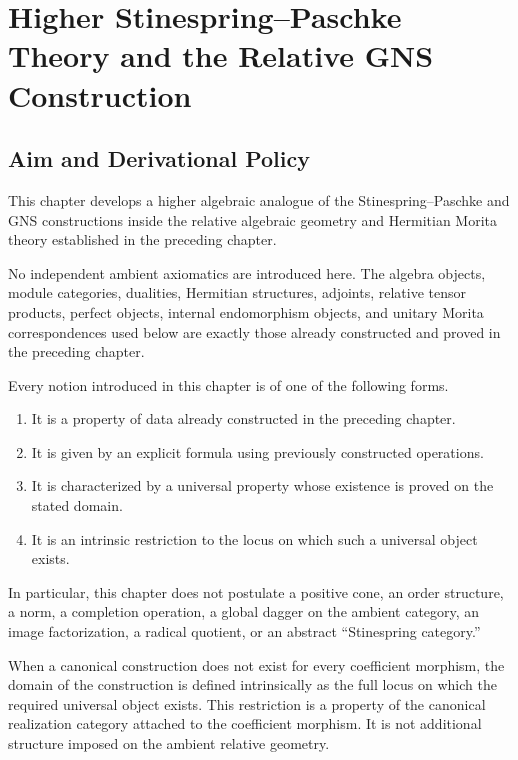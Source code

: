 \chapter{Higher Stinespring--Paschke Theory and the Relative GNS Construction}
\label{chap:higher-stinespring-paschke-gns}

\section{Aim and Derivational Policy}
\label{sec:higher-stinespring-aim-policy}

This chapter develops a higher algebraic analogue of the
Stinespring--Paschke and GNS constructions inside the relative algebraic
geometry and Hermitian Morita theory established in the preceding chapter.

No independent ambient axiomatics are introduced here. The algebra objects,
module categories, dualities, Hermitian structures, adjoints, relative tensor
products, perfect objects, internal endomorphism objects, and unitary Morita
correspondences used below are exactly those already constructed and proved in
the preceding chapter.

Every notion introduced in this chapter is of one of the following forms.

\begin{enumerate}
  \item It is a property of data already constructed in the preceding
  chapter.

  \item It is given by an explicit formula using previously constructed
  operations.

  \item It is characterized by a universal property whose existence is proved
  on the stated domain.

  \item It is an intrinsic restriction to the locus on which such a universal
  object exists.
\end{enumerate}

In particular, this chapter does not postulate a positive cone, an order
structure, a norm, a completion operation, a global dagger on the ambient
category, an image factorization, a radical quotient, or an abstract
``Stinespring category.''

When a canonical construction does not exist for every coefficient morphism,
the domain of the construction is defined intrinsically as the full locus on
which the required universal object exists. This restriction is a property of
the canonical realization category attached to the coefficient morphism. It
is not additional structure imposed on the ambient relative geometry.

